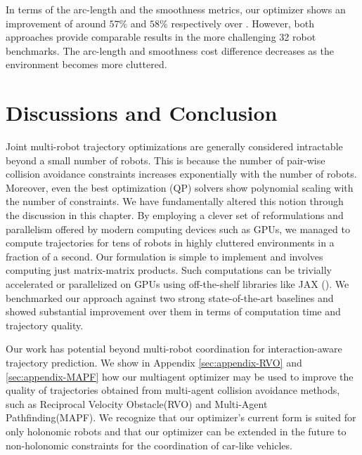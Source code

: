 In terms of the arc-length and the smoothness metrics, our optimizer shows an improvement of around $57 \%$ and $58\%$ respectively over \citep{aks_ral21}. However, both approaches provide comparable results in the more challenging 32 robot benchmarks. The arc-length and smoothness cost difference decreases as the environment becomes more cluttered. 

\section{Discussions and Conclusion}

Joint multi-robot trajectory optimizations are generally considered intractable beyond a small number of robots. This is because the number of pair-wise collision avoidance constraints increases exponentially with the number of robots. Moreover, even the best optimization (QP) solvers show polynomial scaling with the number of constraints. We have fundamentally altered this notion through the discussion in this chapter. By employing a clever set of reformulations and parallelism offered by modern computing devices such as GPUs, we managed to compute trajectories for tens of robots in highly cluttered environments in a fraction of a second. Our formulation is simple to implement and involves computing just matrix-matrix products. Such computations can be trivially accelerated or parallelized on GPUs using off-the-shelf libraries like JAX (\cite{bradbury2020jax}). We benchmarked our approach against two strong state-of-the-art baselines and showed substantial improvement over them in terms of computation time and trajectory quality. 

Our work has potential beyond multi-robot coordination for interaction-aware trajectory prediction. We show in Appendix \ref{sec:appendix-RVO} and \ref{sec:appendix-MAPF} how our multiagent optimizer may be used to improve the quality of trajectories obtained from multi-agent collision avoidance methods, such as Reciprocal Velocity Obstacle(RVO)\cite{RVO} and Multi-Agent Pathfinding(MAPF)\cite{sharon_journal}. We recognize that our optimizer's current form is suited for only holonomic robots and that our optimizer can be extended in the future to non-holonomic constraints for the coordination of car-like vehicles. 


